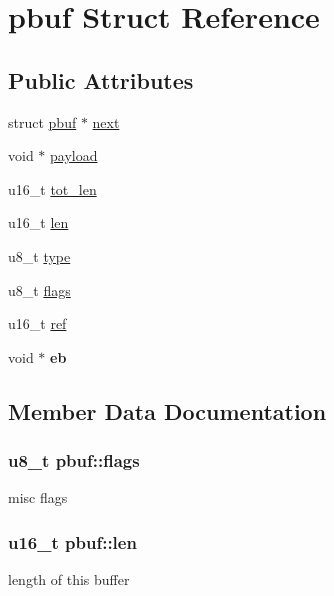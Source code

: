 \hypertarget{structpbuf}{}\section{pbuf Struct Reference}
\label{structpbuf}
\subsection*{Public Attributes}
\begin{DoxyCompactItemize}
\item 
struct \hyperlink{structpbuf}{pbuf} $\ast$ \hyperlink{structpbuf_a5e5763c94fd18d78937b0b58ce7df341}{next}
\item 
void $\ast$ \hyperlink{structpbuf_a8d32dc3e964369d4eec638fc37fbc460}{payload}
\item 
u16\+\_\+t \hyperlink{structpbuf_a5259e7ec29bab9c0999b64f2e86b411f}{tot\+\_\+len}
\item 
u16\+\_\+t \hyperlink{structpbuf_a6f82449625e36e294f5d210268c0703f}{len}
\item 
u8\+\_\+t \hyperlink{structpbuf_afd7bff5210a022424caa97d2f25fe8e6}{type}
\item 
u8\+\_\+t \hyperlink{structpbuf_aa4d1af2cab3d9280d29212095b5b872a}{flags}
\item 
u16\+\_\+t \hyperlink{structpbuf_a18e2c02942feb1baa3756fcd585b6731}{ref}
\item 
\hypertarget{structpbuf_a49924e7a48749a7ed303f64cf3c8d235}{}void $\ast$ {\bfseries eb}\label{structpbuf_a49924e7a48749a7ed303f64cf3c8d235}

\end{DoxyCompactItemize}


\subsection{Member Data Documentation}
\hypertarget{structpbuf_aa4d1af2cab3d9280d29212095b5b872a}{}
\subsubsection[{flags}]{\setlength{\rightskip}{0pt plus 5cm}u8\+\_\+t pbuf\+::flags}\label{structpbuf_aa4d1af2cab3d9280d29212095b5b872a}
misc flags \hypertarget{structpbuf_a6f82449625e36e294f5d210268c0703f}{}
\subsubsection[{len}]{\setlength{\rightskip}{0pt plus 5cm}u16\+\_\+t pbuf\+::len}\label{structpbuf_a6f82449625e36e294f5d210268c0703f}
length of this buffer \hypertarget{structpbuf_a5e5763c94fd18d78937b0b58ce7df341}{}
